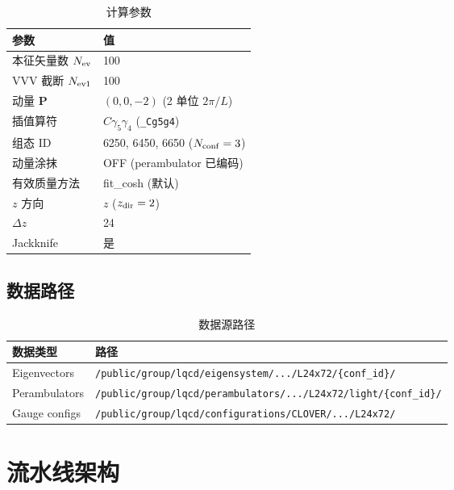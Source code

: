 \documentclass[12pt,a4paper]{ctexart}
\begin{document}
\begin{table}[htbp]
\centering
\caption{计算参数}
\label{tab:params}
\begin{tabular}{ll}
\toprule
\textbf{参数}          & \textbf{值} \\
\midrule
本征矢量数 $N_{\rm ev}$  & 100 \\
VVV 截断 $N_{\rm ev1}$   & 100 \\
动量 $\mathbf{P}$        & $(0,0,-2)$  (2 单位 $2\pi/L$) \\
插值算符                  & $C\gamma_5\gamma_4$ (\texttt{\_Cg5g4}) \\
组态 ID                   & 6250, 6450, 6650 ($N_{\rm conf}=3$) \\
动量涂抹                  & OFF (perambulator 已编码) \\
有效质量方法              & fit\_cosh (默认) \\
$z$ 方向                  & $z$ ($z_{\rm dir}=2$) \\
$\Delta z$                & 24 \\
Jackknife                 & 是 \\
\bottomrule
\end{tabular}
\end{table}

\subsection{数据路径}

\begin{table}[htbp]
\centering
\caption{数据源路径}
\label{tab:paths}
\begin{tabular}{ll}
\toprule
\textbf{数据类型} & \textbf{路径} \\
\midrule
Eigenvectors & \texttt{/public/group/lqcd/eigensystem/.../L24x72/\{conf\_id\}/} \\
Perambulators & \texttt{/public/group/lqcd/perambulators/.../L24x72/light/\{conf\_id\}/} \\
Gauge configs & \texttt{/public/group/lqcd/configurations/CLOVER/.../L24x72/} \\
\bottomrule
\end{tabular}
\end{table}

\section{流水线架构}
\end{document}
